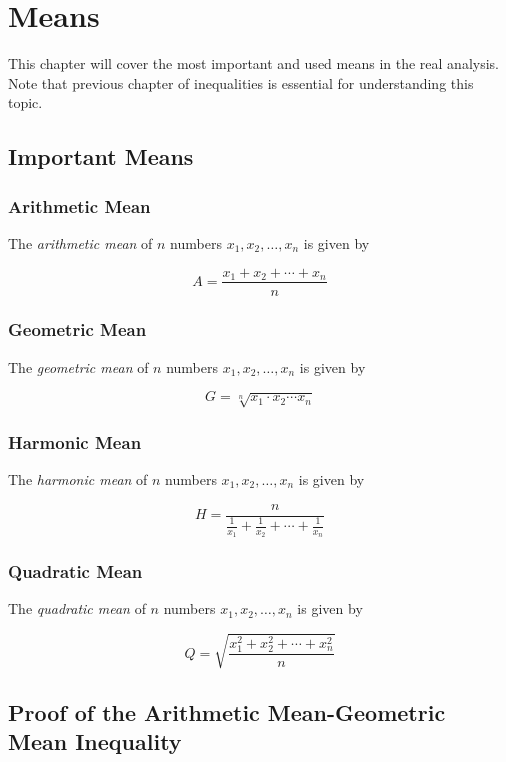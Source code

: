 \chapter{Means}

This chapter will cover the most important and used means in the real analysis. Note that previous chapter of inequalities
is essential for understanding this topic.

\section{Important Means}

\subsection{Arithmetic Mean}

The \emph{arithmetic mean} of \(n\) numbers \( x_1, x_2, \dots, x_n \) is given by

\[
	A = \frac{x_1 + x_2 + \cdots + x_n}{n}
\]

\subsection{Geometric Mean}

The \emph{geometric mean} of \(n\) numbers \( x_1, x_2, \dots, x_n \) is given by

\[
	G = \sqrt[n]{x_1 \cdot x_2 \cdots x_n}
\]

\subsection{Harmonic Mean}

The \emph{harmonic mean} of \(n\) numbers \( x_1, x_2, \dots, x_n \) is given by

\[
	H = \frac{n}{\frac{1}{x_1} + \frac{1}{x_2} + \cdots + \frac{1}{x_n}}
\]

\subsection{Quadratic Mean}

The \emph{quadratic mean} of \(n\) numbers \( x_1, x_2, \dots, x_n \) is given by

\[
	Q = \sqrt{\frac{x_1^2 + x_2^2 + \cdots + x_n^2}{n}}
\]

\section{Proof of the Arithmetic Mean-Geometric Mean Inequality}

